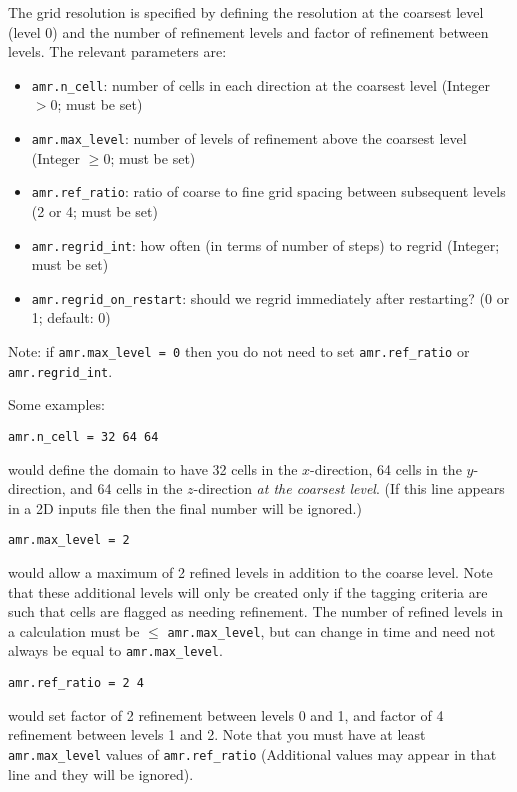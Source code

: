The grid resolution is specified by defining the resolution at the
coarsest level (level 0) and the number of refinement levels and
factor of refinement between levels.  The relevant parameters are:
\begin{itemize}
\item {\tt amr.n\_cell}:  number of cells in each direction at the coarsest level (Integer $> 0$; must be set)

\item {\tt amr.max\_level}:  number of levels of refinement above the coarsest level (Integer $\geq 0$; must be set)

\item {\tt amr.ref\_ratio}: ratio of coarse to fine grid spacing between subsequent levels (2 or 4; must be set)

\item {\tt amr.regrid\_int}: how often (in terms of number of steps) to regrid (Integer; must be set)

\item {\tt amr.regrid\_on\_restart}: should we regrid immediately after restarting? (0 or 1; default: 0)
\end{itemize}

Note: if {\tt amr.max\_level = 0} then you do not need to set {\tt amr.ref\_ratio} or {\tt amr.regrid\_int}.

Some examples:
\begin{lstlisting}
amr.n_cell = 32 64 64
\end{lstlisting}
would define the domain to have 32 cells in the $x$-direction, 64 cells
in the $y$-direction, and 64 cells in the $z$-direction {\em{at the
coarsest level}}.  (If this line appears in a 2D inputs file then the
final number will be ignored.)

\begin{lstlisting}
amr.max_level = 2 
\end{lstlisting}
would allow a maximum of 2 refined levels in addition to the coarse
level.  Note that these additional levels will only be created only if
the tagging criteria are such that cells are flagged as needing
refinement.  The number of refined levels in a calculation must be
$\leq$ {\tt amr.max\_level}, but can change in time and need not
always be equal to {\tt amr.max\_level}.
 
\begin{lstlisting}
amr.ref_ratio = 2 4 
\end{lstlisting}
would set factor of 2 refinement between levels 0 and 1, and factor of 4
refinement between levels 1 and 2.  Note that you must have at least
{\tt amr.max\_level} values of {\tt amr.ref\_ratio} (Additional values
may appear in that line and they will be ignored).

